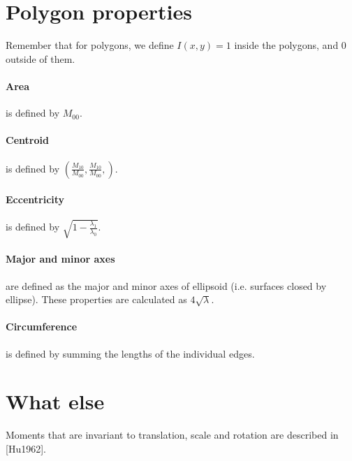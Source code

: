 \documentclass{article}
\begin{document}
\section{Polygon properties}
Remember that for polygons, we define $I(x,y)=1$ inside the polygons, and $0$ outside of them.
\paragraph{Area} is defined by $M_{00}$.
\paragraph{Centroid} is defined by $\left(\frac{M_{10}}{M_{00}}, \frac{M_{10}}{M_{00}}, \right)$.
\paragraph{Eccentricity} is defined by $\sqrt{1-\frac{\lambda_1}{\lambda_0}}$.
\paragraph{Major and minor axes} are defined as the major and minor axes of ellipsoid (i.e. surfaces closed by ellipse). These properties are calculated as $4\sqrt{\lambda}$.
\paragraph{Circumference} is defined by summing the lengths of the individual edges.

\section{What else}
Moments that are invariant to translation, scale and rotation are described in [Hu1962].
\end{document}
